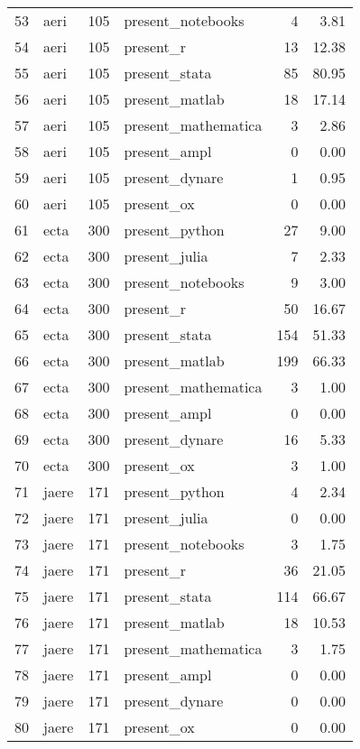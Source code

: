 \begin{table}[ht]
\begin{tabular}{rlrlrr}
  53 & aeri & 105 & present\_notebooks &   4 & 3.81 \\ 
  54 & aeri & 105 & present\_r &  13 & 12.38 \\ 
  55 & aeri & 105 & present\_stata &  85 & 80.95 \\ 
  56 & aeri & 105 & present\_matlab &  18 & 17.14 \\ 
  57 & aeri & 105 & present\_mathematica &   3 & 2.86 \\ 
  58 & aeri & 105 & present\_ampl &   0 & 0.00 \\ 
  59 & aeri & 105 & present\_dynare &   1 & 0.95 \\ 
  60 & aeri & 105 & present\_ox &   0 & 0.00 \\ 
  61 & ecta & 300 & present\_python &  27 & 9.00 \\ 
  62 & ecta & 300 & present\_julia &   7 & 2.33 \\ 
  63 & ecta & 300 & present\_notebooks &   9 & 3.00 \\ 
  64 & ecta & 300 & present\_r &  50 & 16.67 \\ 
  65 & ecta & 300 & present\_stata & 154 & 51.33 \\ 
  66 & ecta & 300 & present\_matlab & 199 & 66.33 \\ 
  67 & ecta & 300 & present\_mathematica &   3 & 1.00 \\ 
  68 & ecta & 300 & present\_ampl &   0 & 0.00 \\ 
  69 & ecta & 300 & present\_dynare &  16 & 5.33 \\ 
  70 & ecta & 300 & present\_ox &   3 & 1.00 \\ 
  71 & jaere & 171 & present\_python &   4 & 2.34 \\ 
  72 & jaere & 171 & present\_julia &   0 & 0.00 \\ 
  73 & jaere & 171 & present\_notebooks &   3 & 1.75 \\ 
  74 & jaere & 171 & present\_r &  36 & 21.05 \\ 
  75 & jaere & 171 & present\_stata & 114 & 66.67 \\ 
  76 & jaere & 171 & present\_matlab &  18 & 10.53 \\ 
  77 & jaere & 171 & present\_mathematica &   3 & 1.75 \\ 
  78 & jaere & 171 & present\_ampl &   0 & 0.00 \\ 
  79 & jaere & 171 & present\_dynare &   0 & 0.00 \\ 
  80 & jaere & 171 & present\_ox &   0 & 0.00 \\ 

\end{tabular}
\end{table}
